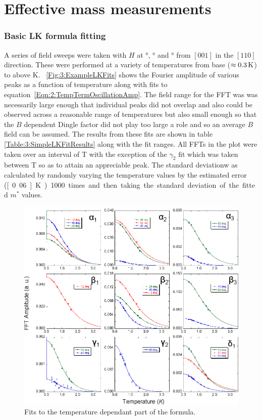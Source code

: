 
\section{Effective mass measurements}


\subsubsection{Basic LK formula fitting}

A series of field sweeps were taken with $H$ at \unit[12]{\degree}, \unit[28]{\degree} and \unit[46]{\degree} from $[001]$ in the $[110]$ direction. These were performed at a variety of temperatures from base ($\approx\unit[0.3]{K}$) to above \unit[2]{K}. \Fig~\ref{Fig:3:ExampleLKFits} shows the Fourier amplitude of various peaks as a function of temperature along with fits to equation~\ref{Eqn:2:TempTermOscillationAmp}. The field range for the FFT was was necessarily large enough that individual peaks did not overlap and also could be observed across a reasonable range of temperatures but also small enough so that the $B$ dependent Dingle factor did not play too large a role and so an average $B$ field can be assumed. The results from these fits are shown in table \ref{Table:3:SimpleLKFitResults} along with the fit ranges. All FFTs in the plot were taken over an interval of \unit[12--18]{T} with the exception of the $\gamma_2$ fit which was taken between \unit[16-18]{T} so as to attain an appreciable peak. The standard deviationw as calculated by randomly varying the temperature values by the estimated error (\unit[0.06]{K}) 1000 times and then taking the standard deviation of the fitted $m^*$ values.
\begin{figure}[h!]
    \begin{center}
        \includegraphics[scale=0.7]{Chapter3-dHvABaFe2P2/Figures/Mass/SimpleLKFits/SimpleLKFits}
        \caption{Fits to the temperature dependant part of the \LK formula. }
        \label{Fig:3:SimpleLKFits}
    \end{center}
\end{figure}
